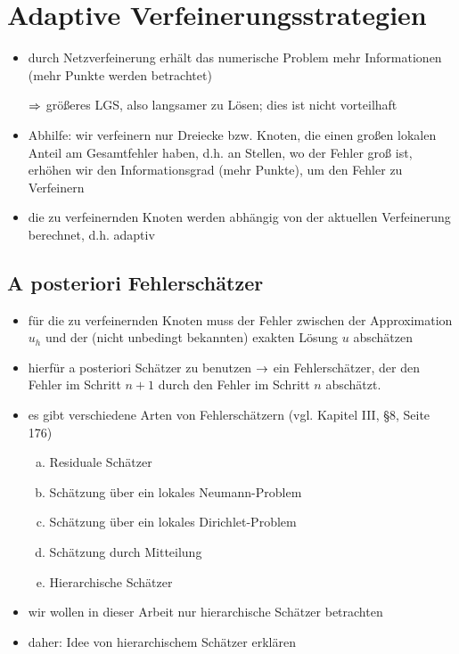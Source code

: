 \section{Adaptive Verfeinerungsstrategien}
\label{kap:2.4}

\begin{itemize}
\item durch Netzverfeinerung erhält das numerische Problem mehr Informationen (mehr Punkte werden betrachtet)

\item[$\Rightarrow$]  größeres LGS, also langsamer zu Lösen; dies ist nicht vorteilhaft 

\item Abhilfe: wir verfeinern nur Dreiecke bzw. Knoten, die einen großen lokalen Anteil am Gesamtfehler haben, d.h. an Stellen, wo der Fehler groß ist, erhöhen wir den Informationsgrad (mehr Punkte), um den Fehler zu Verfeinern

\item die zu verfeinernden Knoten werden abhängig von der aktuellen Verfeinerung berechnet, d.h. adaptiv
\end{itemize}

\subsection{A posteriori Fehlerschätzer}
\label{kap:2.4.1}

\begin{itemize}
\item für die zu verfeinernden Knoten muss der Fehler zwischen der Approximation $u_h$ und der (nicht unbedingt bekannten) exakten Lösung $u$ abschätzen

\item hierfür a posteriori Schätzer zu benutzen $\rightarrow$ ein Fehlerschätzer, der den Fehler im Schritt $n+1$ durch den Fehler im Schritt $n$ abschätzt.

\item es gibt verschiedene Arten von Fehlerschätzern (vgl. \cite{BraeFEM} Kapitel III, \S 8, Seite 176)
\begin{enumerate}[(a)]
\item Residuale Schätzer
\item Schätzung über ein lokales Neumann-Problem
\item Schätzung über ein lokales Dirichlet-Problem
\item Schätzung durch Mitteilung
\item Hierarchische Schätzer
\end{enumerate}

\item wir wollen in dieser Arbeit nur hierarchische Schätzer betrachten

\item daher: Idee von hierarchischem Schätzer erklären
\end{itemize}


